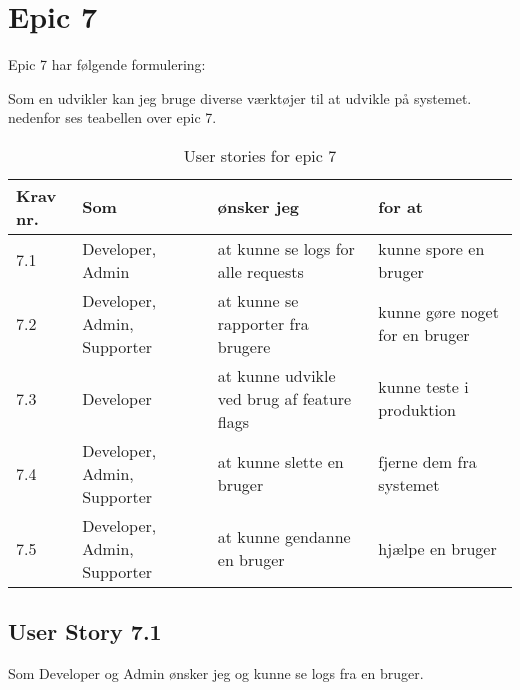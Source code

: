 \section{Epic 7}
Epic 7 har følgende formulering:

Som en udvikler kan jeg bruge diverse værktøjer til at udvikle på systemet.
nedenfor ses teabellen over epic 7.

\begin{table}[H]
    \centering
    \caption{User stories for epic 7}
    \label{tab:us-epic7}
    \begin{tabular}{p{1cm}|p{2cm}|p{6cm}|p{6cm}}
        \textbf{Krav nr.} & \textbf{Som}                & \textbf{ønsker jeg}                        & \textbf{for at}                \\\hline
        7.1               & Developer, Admin            & at kunne se logs for alle requests         & kunne spore en bruger          \\\hline
        7.2               & Developer, Admin, Supporter & at kunne se rapporter fra brugere          & kunne gøre noget for en bruger \\\hline
        7.3               & Developer                   & at kunne udvikle ved brug af feature flags & kunne teste i produktion       \\\hline
        7.4               & Developer, Admin, Supporter & at kunne slette en bruger                  & fjerne dem fra systemet        \\\hline
        7.5               & Developer, Admin, Supporter & at kunne gendanne en bruger                & hjælpe en bruger               \\
    \end{tabular}
\end{table}



\subsection{User Story 7.1}
Som Developer og Admin ønsker jeg og kunne se logs fra en bruger.

